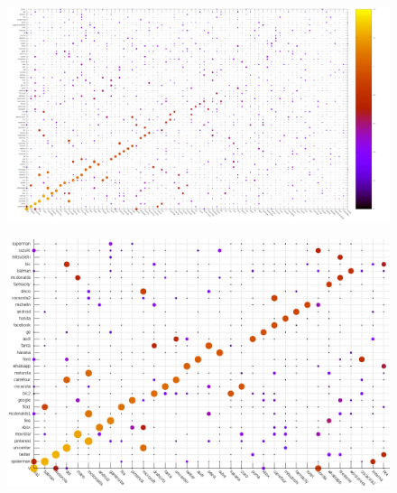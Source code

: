 \documentclass{beamer}
\begin{document}
\begin{frame}
\begin{figure}[h]
 \centering
  \begin{minipage}[c]{1\textwidth}
	\centering	
	\includegraphics[scale=0.13]{random.png}
  \end{minipage}
\end{figure}
\end{frame}

\begin{frame}
\begin{figure}[h]
 \centering
  \begin{minipage}[c]{1\textwidth}
	\centering	
	\includegraphics[scale=0.32]{randomx.png}
  \end{minipage}
\end{figure}
\end{frame}
\end{document}
